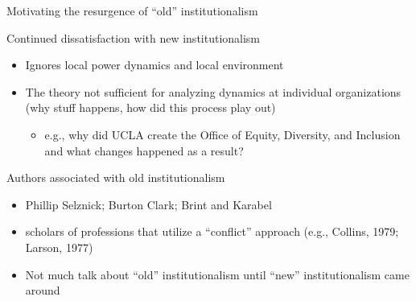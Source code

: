 \begin{frame}{Motivating the resurgence of ``old'' institutionalism}

	Continued dissatisfaction with new institutionalism
	\begin{itemize}
		\item Ignores local power dynamics and local environment
		\item The theory not sufficient for analyzing dynamics at individual organizations (why stuff happens, how did this process play out)
		\begin{itemize}
			\item e.g., why did UCLA create the Office of Equity, Diversity, and Inclusion and what changes happened as a result?
		\end{itemize}
	\end{itemize}
	\vspace{2mm}
	Authors associated with old institutionalism
	\begin{itemize}
		\item Phillip Selznick; Burton Clark; Brint and Karabel 
		\item scholars of professions that utilize a ``conflict'' approach (e.g., Collins, 1979; Larson, 1977)
		\item Not much talk about ``old'' institutionalism until ``new'' institutionalism came around
	\end{itemize}
	\vspace{2mm}
\end{frame}


